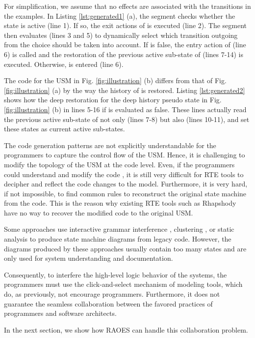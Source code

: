 For simplification, we assume that no effects are associated with the transitions in the examples.
In Listing \ref{lst:generated1} (a), the segment checks whether the state  is active (line 1).
If so, the exit actions of  is executed (line 2).
The segment then evaluates  (lines 3 and 5) to dynamically select which transition outgoing from the choice  should be taken into account.
If  is false, the entry action of  (line 6) is called and the restoration of the previous active sub-state of  (lines 7-14) is executed. 
Otherwise,  is entered (line 6).

The code for the USM in Fig. \ref{fig:illustration} (b) differs from that of Fig. \ref{fig:illustration} (a) by the way the history of  is restored.
Listing \ref{lst:generated2} shows how the deep restoration for the deep history pseudo state in Fig. \ref{fig:illustration} (b) in lines 5-16 if  is evaluated as false.
These lines actually read the previous active sub-state of not only  (lines 7-8) but also  (lines 10-11), and set these states as current active sub-states.



The code generation patterns are not explicitly understandable for the programmers to capture the control flow of the USM. %
Hence, it is challenging to modify the topology of the USM at the code level. 
Even, if the programmers could understand and modify the code %
, it is still very difficult for RTE tools to decipher and reflect the code changes to the model.
Furthermore, 
it is very hard, if not impossible, to find common rules to reconstruct the original state machine from the code. 
This is the reason why existing RTE tools such as Rhapshody 
have no way to recover the modified code to the original USM.



Some approaches use interactive grammar interference \cite{walkinshaw2007reverse}, clustering \cite{hall2010superstate}, or static analysis \cite{DBLP:conf/kbse/AbadiF12} to produce state machine diagrams from legacy code.
However, the diagrams produced by these approaches usually contain too many states and are only used for system understanding and documentation. 

Consequently, to interfere the high-level logic behavior of the systems, the programmers must use the click-and-select mechanism of modeling tools, which do, as previously, not encourage programmers. 
Furthermore, it does not guarantee the seamless collaboration between the favored practices of programmers and software architects.  

In the next section, we show how RAOES can handle this collaboration problem.